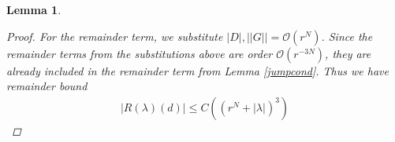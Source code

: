 \documentclass[12pt]{article}
\newtheorem{lemma}{Lemma}
\begin{document}
\begin{lemma}
\begin{proof}
For the remainder term, we substitute $|D|, ||G|| = \mathcal{O}(r^N)$. Since the remainder terms from the substitutions above are order $\mathcal{O}(r^{-3N})$, they are already included in the remainder term from Lemma \ref{jumpcond}. Thus we have remainder bound
\begin{align*}
|R(\lambda)(d)| \leq C\left( (r^N + |\lambda|)^3 \right)
\end{align*}
\end{proof}
\end{lemma}



\end{document}
